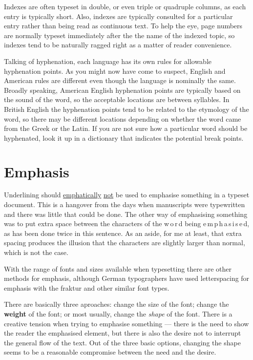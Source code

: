 \documentclass[10pt,letterpaper]{memoir}
\begin{document}
    Indexes are often typeset in double, or even triple or quadruple columns,
as each entry is typically short. Also, indexes are typically consulted
for a particular entry rather than being read as continuous text. To help
the eye, page numbers are normally typeset immediately after the 
the name of the indexed topic, so indexes tend to be naturally ragged right
as a matter of reader convenience.


    Talking of hyphenation,
 each language has its own rules for allowable
hyphenation points. As you might now have come to suspect, English and 
American rules are different even though the language is nominally the same.
Broadly speaking, American English hyphenation points are typically based on
the sound of the word, so the acceptable locations are between syllables.
In British English the hyphenation points tend to be related to the
etymology of the word, so there may be different locations depending on 
whether the word came from the Greek or the Latin. If you are not sure
how a particular word should be hyphenated, look it up in a dictionary
that indicates the potential break points.

\section{Emphasis}

    Underlining should \underline{emphatically} \underline{not} be
used to emphasise something in a typeset document. This is a hangover
from the days when manuscripts were typewritten and there was little
that could be done. The other way of emphasising something was to
put extra space between the characters of the w\,o\,r\,d being
e\,m\,p\,h\,a\,s\,i\,s\,e\,d, as has been done twice in this sentence.
As an aside, for me at least, that extra spacing produces the 
illusion that the
characters are slightly larger than normal, which is not the case.

    With the range of fonts and sizes available when typesetting there
are other methods for emphasis, although German typographers have used
letterspacing for emphasis with the fraktur and other similar font types.

    There are basically three aproaches: 
change the {\large size} of the font;
change the \textbf{weight} of the font; or most usually, change the
\emph{shape} of the font. There is a creative tension when trying
to emphasise something --- there is the need to show the reader the 
emphasised
element, but there is also the desire not to interrupt the general flow
of the text. Out of the three basic options, changing the shape seems
to be a reasonable compromise between the need and the desire.
\end{document}
